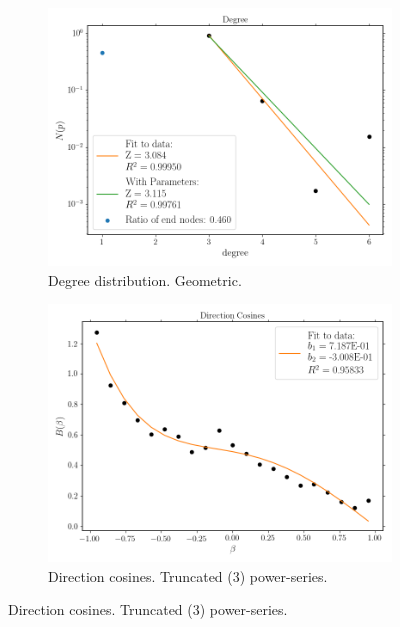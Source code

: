 \begin{figure}[H]
  \centering
  \begin{subfigure}{0.5\textwidth}
    \centering
    \includegraphics[width=0.99\linewidth]{Figures/chapter-image/pipeline_screenshots/pectin_degree_c_m.png}
    \caption{Degree distribution. Geometric.}
    \label{subfig:pectin_degree}
  \end{subfigure}%
  \begin{subfigure}{0.5\textwidth}
    \centering
    \includegraphics[width=0.99\linewidth]{Figures/chapter-image/pipeline_screenshots/pectin_cosines_c_m_iPA_iShort2_bins21.png}
    \caption{Direction cosines. Truncated (3) power-series.}
    \label{subfig:pectin_cosines}

\end{subfigure}
\end{figure}
